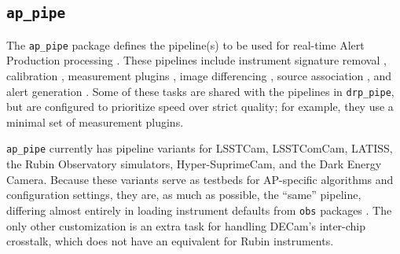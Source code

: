 \subsection{\texttt{ap\_pipe}}
\label{sec:ap_pipe}

The \texttt{ap\_pipe} package defines the pipeline(s) to be used for real-time Alert Production processing \citep{DMTN-219}.
These pipelines include instrument signature removal , calibration , measurement plugins , image differencing , source association , and alert generation .
Some of these tasks are shared with the pipelines in \texttt{drp\_pipe}, but are configured to prioritize speed over strict quality; for example, they use a minimal set of measurement plugins.

\texttt{ap\_pipe} currently has pipeline variants for LSSTCam, LSSTComCam, LATISS, the Rubin Observatory simulators, Hyper-SuprimeCam, and the Dark Energy Camera.
Because these variants serve as testbeds for AP-specific algorithms and configuration settings, they are, as much as possible, the ``same'' pipeline, differing almost entirely in loading instrument defaults from \texttt{obs} packages .
The only other customization is an extra task for handling DECam's inter-chip crosstalk, which does not have an equivalent for Rubin instruments.
